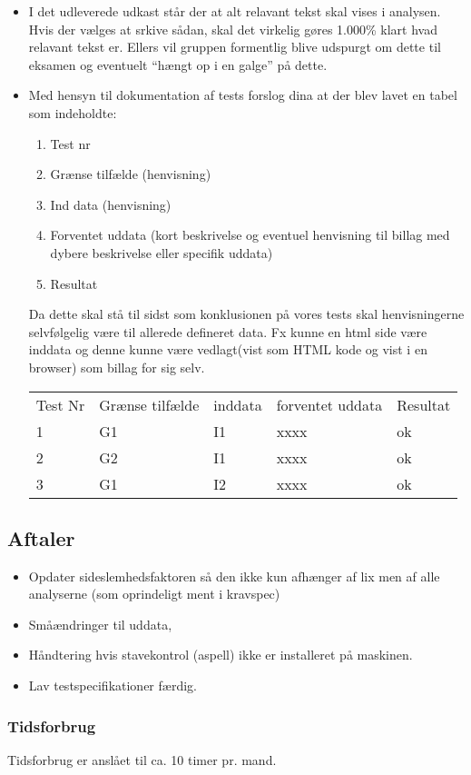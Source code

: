\begin{itemize}
\item I det udleverede udkast står der at alt relavant tekst skal vises i analysen. Hvis der vælges at srkive sådan, skal det virkelig gøres 1.000\% klart hvad relavant tekst er. Ellers vil gruppen formentlig blive udspurgt om dette til eksamen og eventuelt ``hængt op i en galge'' på dette.

\item Med hensyn til dokumentation af tests forslog dina at der blev lavet en tabel som indeholdte: 
\begin{enumerate}
 \item Test nr
\item Grænse tilfælde (henvisning)
\item Ind data (henvisning)
\item Forventet uddata (kort beskrivelse og eventuel henvisning til billag med dybere beskrivelse eller specifik uddata)
\item Resultat
\end{enumerate}

Da dette skal stå til sidst som konklusionen på vores tests skal henvisningerne selvfølgelig være til allerede defineret data. Fx kunne en html side være inddata og denne kunne være vedlagt(vist som HTML kode og vist i en browser) som billag for sig selv.

\begin{center}
\begin{tabular}{lllll}
Test Nr & Grænse tilfælde & inddata & forventet uddata & Resultat \\ 
1 & G1 & I1 & xxxx & ok \\ 
2 & G2 & I1 & xxxx & ok \\ 
3 & G1 & I2 & xxxx & ok
\end{tabular}
\end{center}

\end{itemize}

\subsection{Aftaler}

\begin{itemize}
 \item Opdater sideslemhedsfaktoren så den ikke kun afhænger af lix men af alle analyserne (som oprindeligt ment i kravspec)
\item Småændringer til uddata,
\item Håndtering hvis stavekontrol (aspell) ikke er installeret på maskinen.
\item Lav testspecifikationer færdig.
\end{itemize}

\subsubsection{Tidsforbrug}
Tidsforbrug er anslået til ca. 10 timer pr. mand.

